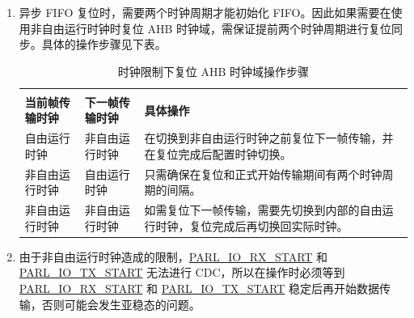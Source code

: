 \documentclass[main\_\_CN.tex]{subfiles}
\begin{document}
\begin{enumerate}
    \item 异步 FIFO 复位时，需要两个时钟周期才能初始化 FIFO。因此如果需要在使用非自由运行时钟时复位 AHB 时钟域，需保证提前两个时钟周期进行复位同步。具体的操作步骤见下表。
    
\begin{table}[H]
    \centering
    \caption{时钟限制下复位 AHB 时钟域操作步骤}
    \label{tab:parlio-ahb-reset-clk-restriction}
    
    \begin{tabular}{|l|l|p{10cm}|}
    \hline
        \rowcolor{lightgray}
        \multicolumn{2}{|c|}{\textbf{时钟限制}} & \\
        \rowcolor{lightgray}
        \textbf{当前帧传输时钟} &\textbf{下一帧传输时钟} & \multirow{-2}{*}{\textbf{具体操作}}\\ \hline
    
        自由运行时钟    & 非自由运行时钟  & 在切换到非自由运行时钟之前复位下一帧传输，并在复位完成后配置时钟切换。    \\ \hline
        非自由运行时钟  & 自由运行时钟    & 只需确保在复位和正式开始传输期间有两个时钟周期的间隔。     \\ \hline
        非自由运行时钟  & 非自由运行时钟  & 如需复位下一帧传输，需要先切换到内部的自由运行时钟，复位完成后再切换回实际时钟。     \\ \hline
    \end{tabular}
\end{table}
    
    \item 由于非自由运行时钟造成的限制，\hyperref[fielddesc:PARLIORXSTART]{PARL\_IO\_RX\_START} 和 \hyperref[fielddesc:PARLIOTXSTART]{PARL\_IO\_TX\_START} 无法进行 CDC，所以在操作时必须等到 \hyperref[fielddesc:PARLIORXSTART]{PARL\_IO\_RX\_START} 和 \hyperref[fielddesc:PARLIOTXSTART]{PARL\_IO\_TX\_START} 稳定后再开始数据传输，否则可能会发生亚稳态的问题。
    

\end{enumerate}
\end{document}
